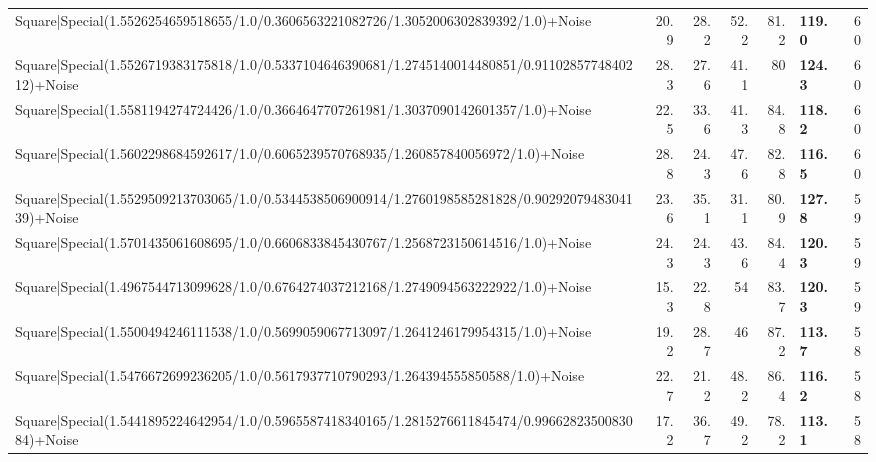 \begin{tabular}{lrrrrlr}
 Square|Special(1.5526254659518655/1.0/0.3606563221082726/1.3052006302839392/1.0)+Noise                                        &            20.9 &           28.2 &            52.2 &            81.2 & \textbf{119.0}  &           60 \\
 Square|Special(1.5526719383175818/1.0/0.5337104646390681/1.2745140014480851/0.9110285774840212)+Noise                         &            28.3 &           27.6 &            41.1 &            80   & \textbf{124.3}  &           60 \\
 Square|Special(1.5581194274724426/1.0/0.3664647707261981/1.3037090142601357/1.0)+Noise                                        &            22.5 &           33.6 &            41.3 &            84.8 & \textbf{118.2}  &           60 \\
 Square|Special(1.5602298684592617/1.0/0.6065239570768935/1.260857840056972/1.0)+Noise                                         &            28.8 &           24.3 &            47.6 &            82.8 & \textbf{116.5}  &           60 \\
 Square|Special(1.5529509213703065/1.0/0.5344538506900914/1.2760198585281828/0.9029207948304139)+Noise                         &            23.6 &           35.1 &            31.1 &            80.9 & \textbf{127.8}  &           59 \\
 Square|Special(1.5701435061608695/1.0/0.6606833845430767/1.2568723150614516/1.0)+Noise                                        &            24.3 &           24.3 &            43.6 &            84.4 & \textbf{120.3}  &           59 \\
 Square|Special(1.4967544713099628/1.0/0.6764274037212168/1.2749094563222922/1.0)+Noise                                        &            15.3 &           22.8 &            54   &            83.7 & \textbf{120.3}  &           59 \\
 Square|Special(1.5500494246111538/1.0/0.5699059067713097/1.2641246179954315/1.0)+Noise                                        &            19.2 &           28.7 &            46   &            87.2 & \textbf{113.7}  &           58 \\
 Square|Special(1.5476672699236205/1.0/0.5617937710790293/1.264394555850588/1.0)+Noise                                         &            22.7 &           21.2 &            48.2 &            86.4 & \textbf{116.2}  &           58 \\
 Square|Special(1.5441895224642954/1.0/0.5965587418340165/1.2815276611845474/0.9966282350083084)+Noise                         &            17.2 &           36.7 &            49.2 &            78.2 & \textbf{113.1}  &           58 \\

\end{tabular}
